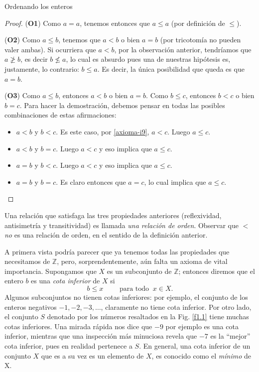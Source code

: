 \begin{section}{Ordenando los enteros}
\begin{ejemplo}
\begin{proof}
(\textbf{O1}) Como $a=a$, tenemos entonces que $a \le a$ (por definición de $\le$).


(\textbf{O2}) Como $a \le b$, tenemos que $a<b$ o bien $a=b$ (por tricotomía no pueden valer ambas). Si ocurriera que $a<b$, por la observación anterior, tendríamos que $a\not\ge b$, es decir $b\not\le a$, lo cual es absurdo pues una de nuestras hipótesis es,  justamente, lo contrario:  $b \le a$.  Es decir, la única posibilidad que queda es que $a=b$.     

(\textbf{O3}) Como $a\le b$, entonces $a <b$ o bien $a=b$. Como $b\le c$, entonces $b<c$ o bien $b=c$. Para hacer la demostración, debemos pensar en todas las posibles combinaciones de estas afirmaciones:
\begin{itemize}
    \item $a<b$ y $b<c$. Es este caso, por  \ref{axioma-i9}, $a<c$. Luego $a\le c$.
    
    \item $a<b$ y $b=c$. Luego $a<c$ y eso implica que $a\le c$.
    
    \item $a=b$ y $b<c$. Luego $a<c$ y eso implica que $a\le c$.
    
    \item $a=b$ y $b=c$. Es claro entonces que $a=c$, lo cual implica que $a\le c$.
\end{itemize}    
\end{proof}
\end{ejemplo}

Una relación que satisfaga las tres propiedades anteriores (reflexividad, antisimetría y transitividad) es llamada \textit{una relación de orden}. Observar que $<$ \textit{no} es una relación de orden, en el sentido de la definición anterior. 

A primera vista podría parecer que ya tenemos todas las propiedades que necesitamos de $\mathbb Z$, pero, sorprendentemente, aún falta un axioma de vital importancia. Supongamos que $X$ es un subconjunto de $\mathbb Z$; entonces diremos que el entero $b$ es una \textit{cota inferior} de $X$ si
$$
b\le x \qquad \text{ para todo } \ x \in X.
$$
Algunos subconjuntos no tienen cotas inferiores: por ejemplo, el conjunto de los enteros negativos $-1, -2, -3, \ldots$, claramente no tiene cota inferior. Por otro lado, el conjunto $S$ denotado por los números resaltados en la Fig. \ref{f1.1} tiene muchas cotas inferiores. Una mirada rápida nos dice que $-9$ por ejemplo es una cota inferior, mientras que una inspección más minuciosa revela que $-7$ es la ``mejor'' cota inferior, pues en realidad pertenece a $S$. En general, una cota inferior de un conjunto $X$ que es a su vez es un elemento de $X$, es conocido como el \textit{mínimo} de X.


\end{section}
